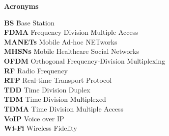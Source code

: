 \begin{center}
{\LARGE\textbf{Acronyms}}
\end{center}
\begin {tabbing}
\textbf{BS} \qquad\qquad\qquad\qquad\qquad\qquad\qquad\= Base Station \\
\textbf{FDMA} \> Frequency Division Multiple Access \\
\textbf{MANETs} \>  Mobile Ad-hoc NETworks \\
\textbf{MHSNs} \> Mobile Healthcare Social Networks \\
\textbf{OFDM} \> Orthogonal Frequency-Division Multiplexing\\
\textbf{RF} \> Radio Frequency \\
\textbf{RTP} \> Real-time Transport Protocol \\
\textbf{TDD} \> Time Division Duplex  \\
\textbf{TDM } \> Time Division Multiplexed \\
\textbf{TDMA} \> Time Division Multiple Access \\
\textbf{VoIP} \> Voice over IP \\
\textbf{Wi-Fi} \> Wireless Fidelity \\





\end{tabbing}
